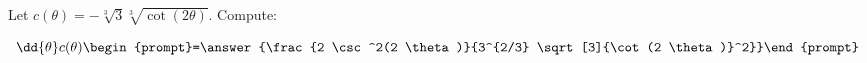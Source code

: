 \documentclass{ximera}
\author{Bart Snapp}
\begin{document}
\begin{exercise}
Let $c(\theta) = -\sqrt[3]{3} \sqrt[3]{\cot (2 \theta )}$. Compute:

\[
\dd{\theta}c(\theta)
\begin{prompt}=\answer{\frac{2 \csc ^2(2 \theta )}{3^{2/3} \sqrt[3]{\cot (2 \theta )}^2}}\end{prompt}
\]
\end{exercise}
\end{document}
